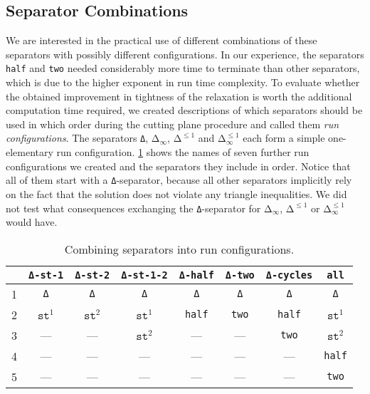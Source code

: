 \subsection{Separator Combinations}\label{subsec:separator_combinations}
We are interested in the practical use of different combinations of these separators with possibly different configurations.
In our experience, the separators \texttt{half} and \texttt{two} needed considerably more time to terminate than other separators, which is due to the higher exponent in run time complexity.
To evaluate whether the obtained improvement in tightness of the relaxation is worth the additional computation time required,
we created descriptions of which separators should be used in which order during the cutting plane procedure and called them \textit{run configurations}.
The separators \texttt{Δ}, $\texttt{Δ}_{\infty}$, $\texttt{Δ}^{\leq 1}$ and $\texttt{Δ}_{\infty}^{\leq 1}$ each form a simple one-elementary run configuration.
\cref{tab:run_configurations} shows the names of seven further run configurations we created and the separators they include in order.
Notice that all of them start with a \texttt{Δ}-separator, because all other separators implicitly rely on the fact that the solution does not violate any triangle inequalities.
We did not test what consequences exchanging the \texttt{Δ}-separator for $\texttt{Δ}_{\infty}$, $\texttt{Δ}^{\leq 1}$ or $\texttt{Δ}_{\infty}^{\leq 1}$ would have.
\begin{table}
\centering
\begin{tabular}{lccccccc}
\toprule
  & \texttt{Δ-st-1} & \texttt{Δ-st-2} & \texttt{Δ-st-1-2}	& \texttt{Δ-half}	& \texttt{Δ-two} 	& \texttt{Δ-cycles}	& \texttt{all}  	\\
\midrule
1 & \texttt{Δ}      & \texttt{Δ}      & \texttt{Δ}      	& \texttt{Δ}		& \texttt{Δ}		& \texttt{Δ}		& \texttt{Δ} 		\\
2 & $\texttt{st}^1$ & $\texttt{st}^2$ & $\texttt{st}^1$ 	& \texttt{half} 	& \texttt{two} 		& \texttt{half}		& $\texttt{st}^1$  	\\
3 & —               & —               & $\texttt{st}^2$ 	& —    				& —   				& \texttt{two}  	& $\texttt{st}^2$  	\\
4 & —               & —               & —               	& —    				& —   				& —      			& \texttt{half}     \\
5 & —               & —               & —               	& —    				& —   				& —      			& \texttt{two}      \\
\bottomrule
\end{tabular}
\caption{Combining separators into run configurations.}
\label{tab:run_configurations}
\end{table}

